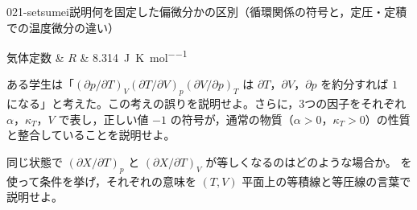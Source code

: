 \documentclass[uplatex,dvipdfmx,a4paper,11pt]{jsarticle}
\begin{document}
\begin{mondai}{021-setsumei}{説明}{何を固定した偏微分かの区別（循環関係の符号と，定圧・定積での温度微分の違い）}
\begin{teisuu}
  気体定数 & $R$ & \qty{8.314}{\joule\per\kelvin\per\mole}\\
\end{teisuu}
\begin{shoumon}
    \item ある学生は「$(\partial p/\partial T)_{V}(\partial T/\partial V)_{p}(\partial V/\partial p)_{T}$ は $\partial T$，$\partial V$，$\partial p$ を約分すれば $1$ になる」と考えた。この考えの誤りを説明せよ。さらに，3つの因子をそれぞれ $\alpha$，$\kappa_{T}$，$V$ で表し，正しい値 $-1$ の符号が，通常の物質（$\alpha > 0$，$\kappa_{T} > 0$）の性質と整合していることを説明せよ。
    \item 同じ状態で $(\partial X/\partial T)_{p}$ と $(\partial X/\partial T)_{V}$ が等しくなるのはどのような場合か。 を使って条件を挙げ，それぞれの意味を $(T,V)$ 平面上の等積線と等圧線の言葉で説明せよ。
  \end{shoumon}


\end{mondai}
\end{document}
